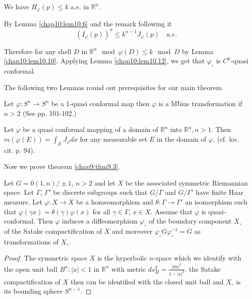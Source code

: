 We have $H_\varphi (p) \leq k$ a.e. in $\mathbb{R}^n$.

By Lemma \ref{chap10:lem10.6} and the remark following it
$$
(I_\varphi (p))^n \leq k^{n-1} J_\varphi (p)\quad a.e. 
$$

Therefore for any shell $D$ in $\mathbb{R}^n \mod \varphi (D)\leq k
\mod D$ by Lemma \ref{chap10:lem10.10}. Applying Lemma
\ref{chap10:lem10.12}, we get that $\varphi_\circ$ is $C^k$-quasi
conformal. 

The following two Lemmas round out prerequisites for our main theorem

\begin{lemma} \label{chap10:lem10.16}
  Let $\varphi: S^n \to S^n$ be a 1-quasi conformal map then $\varphi$
  is a M\"bius transformation if $n > 2$ \hfill (See \cite{17} pp. 101-102.)
\end{lemma}

\begin{lemma} \label{chap10:lem10.17}
  Let $\varphi$ be a quasi conformal mapping of a domain of
  $\mathbb{R}^n$ into $\mathbb{R}^n, n> 1$. Then $m (\varphi(E))=
  \int_E J_\varphi dx$ for any measurable set $E$ in the domain of
  $\varphi$. \hfill (cf. loc. cit. p. 94).
\end{lemma}

Now we prove theorem \ref{chap9:thm9.3}.

\begin{theorem*}
  Let $G= 0 (1, n)/ \pm 1$, $n>2$ and let $X$ be the associated
  symmetric Riemannian space. Let $\Gamma$, $\Gamma'$ be discrete
  subgroups such that $G/\Gamma$ and $G/\Gamma'$ have finite Haar
  measure. Let $\varphi:X \to X$ be a homeomorphism and $\theta:
  \Gamma \to \Gamma'$ an isomorphism such that $\varphi(\gamma x)=
  \theta (\gamma) \varphi(x)$ for all $\gamma \in \Gamma$, $x \in
  X$. Assume that $\varphi$ is quasi-conformal. Then\pageoriginale
  $\varphi$ induces a diffeomorphism $\varphi_\circ$ of the boundary
  component $X_\circ$ of the Satake compactification of $X$ and
  moreover $\varphi_\circ G \varphi_\circ^{-1}=G$ as transformations
  of $X_\circ$.
\end{theorem*}

\begin{proof}
  The symmetric space $X$ is the hyperbolic $n$-space which we
  identify with the open unit ball $B^n: |x|< 1$ in $\mathbb{R}^n$
  with metric $ds^2_H= \frac{|dx|^2}{1- |x|^2}$. the Satake
  compactification of $X$ then can be identified with the closed unit
  ball and $X_\circ$ is its bounding sphere $S^{n-1}$.
\end{proof}

